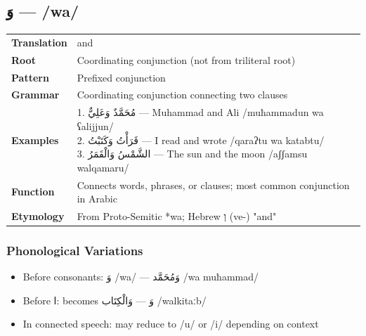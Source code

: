 \documentclass[letterpaper,12pt]{article}
\begin{document}
\subsection{\textarabic{وَ} — /wa/}
\begin{tabular}{p{3cm}p{10cm}}
\toprule
\textbf{Translation} & and \\
\textbf{Root} & Coordinating conjunction (not from triliteral root) \\
\textbf{Pattern} & Prefixed conjunction \\
\textbf{Grammar} & Coordinating conjunction connecting two clauses \\
\midrule
\textbf{Examples} & \makecell[l]{\parbox{9.5cm}{
1. \textarabic{مُحَمَّدٌ وَعَلِيٌّ} — Muhammad and Ali /muħammadun wa ʕalijjun/\\
2. \textarabic{قَرَأْتُ وَكَتَبْتُ} — I read and wrote /qaraʔtu wa katabtu/\\
3. \textarabic{الشَّمْسُ وَالْقَمَرُ} — The sun and the moon /aʃʃamsu walqamaru/
}} \\
\midrule
\textbf{Function} & Connects words, phrases, or clauses; most common conjunction in Arabic \\
\textbf{Etymology} & From Proto-Semitic *wa; Hebrew \texthebrew{וְ} (ve-) "and" \\
\bottomrule
\end{tabular}

\subsubsection*{Phonological Variations}
\begin{itemize}
\item Before consonants: \textarabic{وَ} /wa/ — \textarabic{وَمُحَمَّد} /wa muħammad/
\item Before \textarabic{ا}: becomes \textarabic{وَ} — \textarabic{وَالْكِتَاب} /walkitaːb/
\item In connected speech: may reduce to /u/ or /i/ depending on context
\end{itemize}
\end{document}
